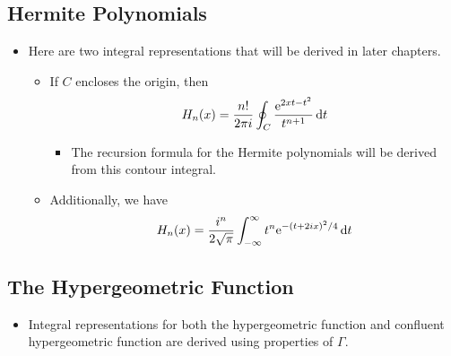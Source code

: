 \documentclass[../finalProject.tex]{subfiles}
\begin{document}
\subsection{Hermite Polynomials}\label{sss:10.6}
\begin{itemize}
    \item Here are two integral representations that will be derived in later chapters.
    \begin{itemize}
        \item If $C$ encloses the origin, then
        \begin{equation*}
            H_n(x) = \frac{n!}{2\pi i}\oint_C\frac{\e[2xt-t^2]}{t^{n+1}}\dd{t}
        \end{equation*}
        \begin{itemize}
            \item The recursion formula for the Hermite polynomials will be derived from this contour integral.
        \end{itemize}
        \item Additionally, we have
        \begin{equation*}
            H_n(x) = \frac{i^n}{2\sqrt{\pi}}\int_{-\infty}^\infty t^n\e[-(t+2ix)^2/4]\dd{t}
        \end{equation*}
    \end{itemize}
\end{itemize}


\subsection{The Hypergeometric Function}
\begin{itemize}
    \item Integral representations for both the hypergeometric function and confluent hypergeometric function are derived using properties of $\Gamma$.
\end{itemize}
\end{document}

